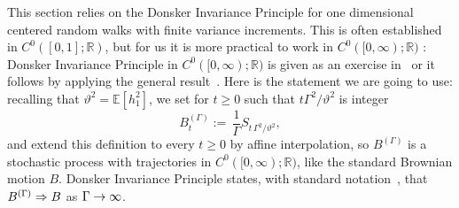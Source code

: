 \documentclass[AHL,Unicode,longabstracts,published]{cedram}
\newcommand{\bbE}{\mathbb{E}}
\newcommand{\bbR}{\mathbb{R}}
\newcommand{\gG}{\Gamma}
\renewcommand*{\implies}{\mathchoice{\Longrightarrow}{\Rightarrow}{\Rightarrow}{\Rightarrow}}
\renewcommand*{\to}{\mathchoice{\longrightarrow}{\rightarrow}{\rightarrow}{\rightarrow}}
\begin{document}
This section relies on the Donsker Invariance Principle for one dimensional centered random walks with finite variance increments. This is often established in $C^0([0, 1]; \bbR)$, but for us it is more practical to work in $C^0([0, \infty); \bbR)$ \cite[Section~1.3]{cf:StroockVaradhan}: Donsker Invariance Principle in $C^0([0, \infty); \bbR)$ is given as an exercise in~\cite[Example~2.4.2]{cf:StroockVaradhan} or it follows by applying the general result~\cite[Theorem~11.2.3]{cf:StroockVaradhan}. Here is the statement we are going to use: recalling that $\vartheta^2=\bbE\left[h_1^2\right]$, we set for $t\ge 0$ such that $ t\gG^2/\vartheta^2$ is integer
\begin{equation}\label{eq:BgGt}
B^{(\gG)}_t:= \, \frac 1 \gG S_{t \,\gG^2 / \vartheta^2},
\end{equation}
and extend this definition to every $t\ge 0$ by affine interpolation, so $B^{(\gG)}$ is a stochastic process with trajectories in $C^0([0, \infty); \bbR)$, like the standard Brownian motion $B$. Donsker Invariance Principle states, with standard notation~\cite{cf:Bill}, that $B^{(\gG)} \implies B$ as $\gG \to \infty$.
\end{document}
